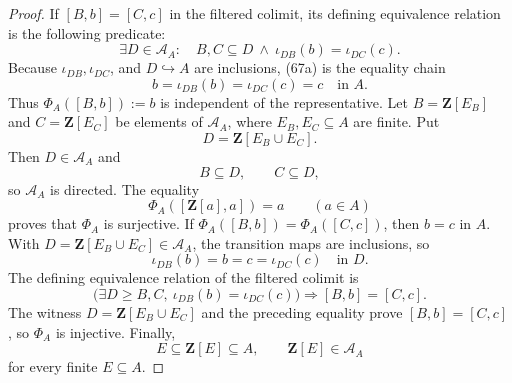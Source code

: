 \begin{proof}
  If \([B,b]=[C,c]\) in the filtered colimit, its defining equivalence
  relation is the following predicate:
  \[
    \exists D\in\mathcal A_A:\quad
    B,C\subseteq D\ \wedge\
    \iota_{DB}(b)=\iota_{DC}(c).                                   \tag{67a}
  \]
  Because \(\iota_{DB},\iota_{DC}\), and \(D\hookrightarrow A\) are
  inclusions, (67a) is the equality chain
  \[
    b=\iota_{DB}(b)=\iota_{DC}(c)=c\quad\text{in }A.                \tag{67b}
  \]
  Thus \(\Phi_A([B,b]):=b\) is independent of the representative.
  Let $B=\mathbf Z[E_B]$ and $C=\mathbf Z[E_C]$ be elements of
  $\mathcal A_A$, where $E_B,E_C\subseteq A$ are finite.  Put
  \[
    D=\mathbf Z[E_B\cup E_C].
  \]
  Then $D\in\mathcal A_A$ and
  \[
    B\subseteq D,
    \qquad
    C\subseteq D,
  \]
  so $\mathcal A_A$ is directed.  The equality
  \[
    \Phi_A([\mathbf Z[a],a])=a\qquad(a\in A)
  \]
  proves that $\Phi_A$ is surjective.  If
  $\Phi_A([B,b])=\Phi_A([C,c])$, then $b=c$ in $A$.  With
  $D=\mathbf Z[E_B\cup E_C]\in\mathcal A_A$, the transition maps are
  inclusions, so
  \[
    \iota_{DB}(b)=b=c=\iota_{DC}(c)\quad\text{in }D.
  \]
  The defining equivalence relation of the filtered colimit is
  \[
    \bigl(\exists D\geq B,C,\ 
      \iota_{DB}(b)=\iota_{DC}(c)\bigr)
      \Longrightarrow [B,b]=[C,c].
  \]
  The witness $D=\mathbf Z[E_B\cup E_C]$ and the preceding equality prove
  $[B,b]=[C,c]$, so $\Phi_A$ is injective.  Finally,
  \[
    E\subseteq\mathbf Z[E]\subseteq A,
    \qquad
    \mathbf Z[E]\in\mathcal A_A
  \]
  for every finite $E\subseteq A$.
\end{proof}

